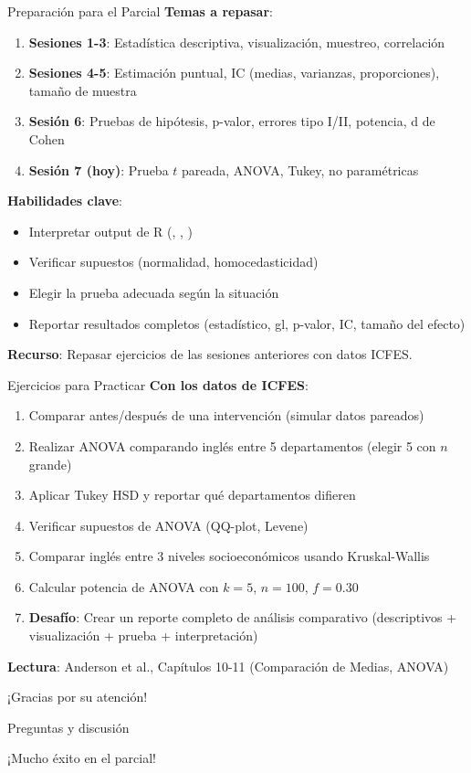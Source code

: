 \documentclass[aspectratio=169, 11pt]{beamer}
\begin{document}
\begin{frame}{Preparación para el Parcial}
\textbf{Temas a repasar}:
\begin{enumerate}
  \item \textbf{Sesiones 1-3}: Estadística descriptiva, visualización, muestreo, correlación
  \item \textbf{Sesiones 4-5}: Estimación puntual, IC (medias, varianzas, proporciones), tamaño de muestra
  \item \textbf{Sesión 6}: Pruebas de hipótesis, p-valor, errores tipo I/II, potencia, d de Cohen
  \item \textbf{Sesión 7 (hoy)}: Prueba $t$ pareada, ANOVA, Tukey, no paramétricas
\end{enumerate}

\vspace{0.3cm}
\textbf{Habilidades clave}:
\begin{itemize}
  \item Interpretar output de R (, , )
  \item Verificar supuestos (normalidad, homocedasticidad)
  \item Elegir la prueba adecuada según la situación
  \item Reportar resultados completos (estadístico, gl, p-valor, IC, tamaño del efecto)
\end{itemize}

\vspace{0.3cm}
\textbf{Recurso}: Repasar ejercicios de las sesiones anteriores con datos ICFES.
\end{frame}

\begin{frame}{Ejercicios para Practicar}
\textbf{Con los datos de ICFES}:
\begin{enumerate}
  \item Comparar  antes/después de una intervención (simular datos pareados)
  \item Realizar ANOVA comparando inglés entre 5 departamentos (elegir 5 con $n$ grande)
  \item Aplicar Tukey HSD y reportar qué departamentos difieren
  \item Verificar supuestos de ANOVA (QQ-plot, Levene)
  \item Comparar inglés entre 3 niveles socioeconómicos usando Kruskal-Wallis
  \item Calcular potencia de ANOVA con $k=5$, $n=100$, $f=0.30$
  \item \textbf{Desafío}: Crear un reporte completo de análisis comparativo (descriptivos + visualización + prueba + interpretación)
\end{enumerate}

\vspace{0.3cm}
\textbf{Lectura}: Anderson et al., Capítulos 10-11 (Comparación de Medias, ANOVA)
\end{frame}

\begin{frame}
\begin{center}
\Large
¡Gracias por su atención!

\vspace{0.5cm}
\normalsize
Preguntas y discusión

\vspace{1cm}
\large
¡Mucho éxito en el parcial!
\end{center}
\end{frame}
\end{document}
